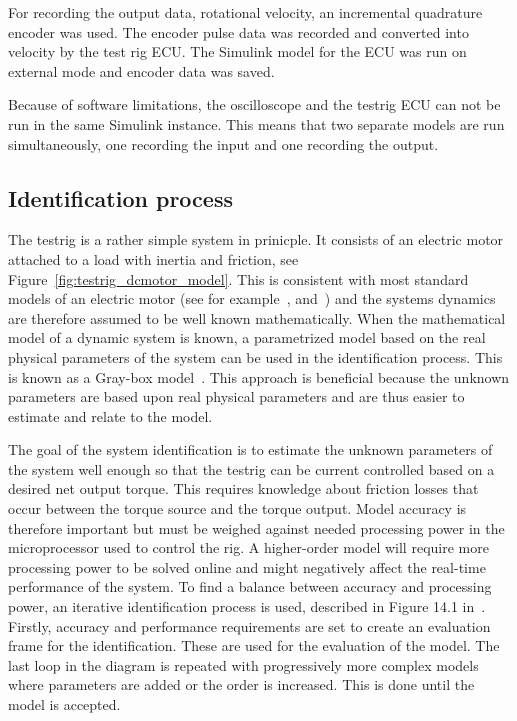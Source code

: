 For recording the output data, rotational velocity, an incremental quadrature
encoder was used. The encoder pulse data was recorded and converted into
velocity by the test rig ECU\@. The Simulink model for the ECU was run on external
mode and encoder data was saved. 

Because of software limitations, the oscilloscope and the testrig ECU can not be
run in the same Simulink instance. This means that two separate models are run
simultaneously, one recording the input and one recording the output.

\subsection{Identification process}
The testrig is a rather simple system in prinicple. It consists of an electric
motor attached to a load with inertia and friction, see
Figure~\ref{fig:testrig_dcmotor_model}.  This is consistent with most standard
models of an electric motor (see for example~\cite{beloiu2014},
\cite{reglerteknik2006} and~\cite{modeling1994}) and the systems dynamics are
therefore assumed to be well known mathematically. When the mathematical model
of a dynamic system is known, a parametrized model based on the real
physical parameters of the system can be used in the identification process.
This is known as a Gray-box model~\cite{modeling1994}. This approach is
beneficial because the unknown parameters are based upon real physical
parameters and are thus easier to estimate and relate to the model. 

The goal of the system identification is to estimate the unknown parameters of the
system well enough so that the testrig can be current controlled based on a 
desired net output torque. This requires knowledge about friction losses that
occur between the torque source and the torque output. Model accuracy is therefore
important but must be weighed against needed processing power in the microprocessor
used to control the rig. A higher-order model will require more processing power
to be solved online and might negatively affect the real-time performance of the
system. To find a balance between accuracy and processing power, an iterative
identification process is used, described in Figure 14.1 in~\cite{modeling1994}. 
Firstly, accuracy and performance requirements are set to create an evaluation
frame for the identification. These are used for the evaluation of the model. 
The last loop in the diagram is repeated with progressively more complex models
where parameters are added or the order is increased. This is done until the
model is accepted.

